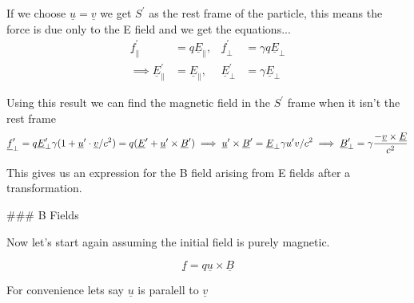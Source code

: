 If we choose $\underline{u}=\underline{v}$ we get $S^\prime$ as the rest frame of the particle, this means the force is due only to the E field and we get the equations...
$$
\begin{aligned}
\underline{f}^\prime_\parallel &= q\underline{E}_\parallel,&\underline{f}^\prime_\perp &= \gamma q\underline{E}_\perp\\
\implies \underline{E}^\prime_\parallel &= \underline{E}_\parallel,&\underline{E}^\prime_\perp &= \gamma\underline{E}_\perp
\end{aligned}
$$

Using this result we can find the magnetic field in the $S^\prime$ frame when it isn't the rest frame
$$
\underline{f}^\prime_\perp = q\underline{E}^\prime_\perp\gamma(1+\underline{u}^\prime\cdot\underline{v}/c^2) = q(\underline{E}^\prime + \underline{u}^\prime\times\underline{B}^\prime)\\
\ \\
\implies \underline{u}^\prime \times \underline{B}^\prime = \underline{E}_\perp \gamma u^\prime v/c^2\\
\ \\
\implies \underline{B}^\prime_\perp = \gamma\frac{-\underline{v}\times\underline{E}}{c^2} 
$$

This gives us an expression for the B field arising from E fields after a transformation.

### B Fields

Now let's start again assuming the initial field is purely magnetic.

$$
\underline{f} = q\underline{u} \times\underline{B}
$$

For convenience lets say $\underline{u}$ is paralell to $\underline{v}$